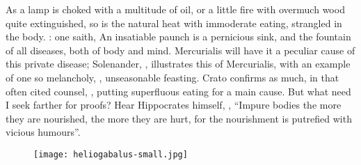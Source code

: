 As a lamp is choked with a multitude of oil, or a little fire with overmuch
wood quite extinguished, so is the natural heat with immoderate eating,
strangled in the body. : one
saith, An insatiable paunch is a pernicious sink, and the fountain of all
diseases, both of body and mind. Mercurialis will have it
a peculiar cause of this private disease; Solenander,
, illustrates this of Mercurialis,
with an example of one so melancholy, ,
unseasonable feasting. Crato confirms as much, in that
often cited counsel, , putting superfluous
eating for a main cause. But what need I seek farther for proofs? Hear
Hippocrates himself, , \enquote{Impure bodies the more they are nourished, the more they are hurt, for
the nourishment is putrefied with vicious humours}.

\begin{figure}[H]
  \begingroup
  \centering
  \texttt{[image: heliogabalus-small.jpg]}
  \label{fig:heliogabalus}
\end{figure}

